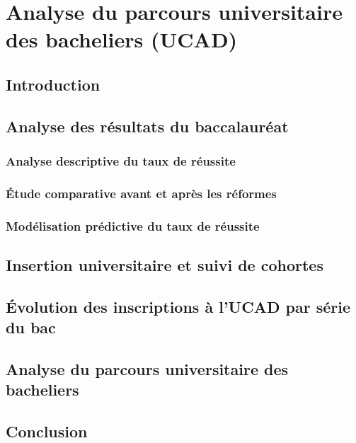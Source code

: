 \chapter{Analyse du parcours universitaire des bacheliers (UCAD)}

\section{Introduction}

\section{Analyse des résultats du baccalauréat}

\subsection{Analyse descriptive du taux de réussite}



\subsection{Étude comparative avant et après les réformes}



\subsection{Modélisation prédictive du taux de réussite}



\section{Insertion universitaire et suivi de cohortes}

\section{Évolution des inscriptions à l'UCAD par série du bac}



\section{Analyse du parcours universitaire des bacheliers}

\section{Conclusion}